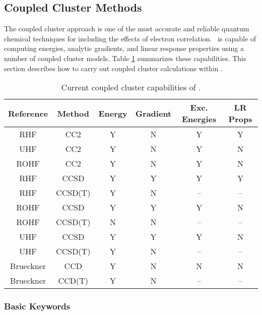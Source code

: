 \subsection{Coupled Cluster Methods} \label{cc}

The coupled cluster approach is one of the most accurate and reliable quantum
chemical techniques for including the effects of electron correlation.
\PSIthree\ is capable of computing energies, analytic gradients, and
linear response properties using a number of coupled cluster models.
Table \ref{table:ccsummary} summarizes these capabilities.  This section
describes how to carry out coupled cluster calculations within \PSIthree.
\begin{table}[h]
\begin{center}
\begin{tabular}{cccccc}
\hline
\hline
Reference & Method & Energy    & Gradient  &  Exc. Energies & LR Props \\
\hline
RHF       & CC2     & Y & N & Y & Y  \\
UHF       & CC2     & Y & N & Y & N  \\
ROHF      & CC2     & Y & N & Y & N  \\
RHF       & CCSD    & Y & Y & Y & Y  \\
RHF       & CCSD(T) & Y & N & --& -- \\
ROHF      & CCSD    & Y & Y & Y & N  \\
ROHF      & CCSD(T) & N & N & --& -- \\
UHF       & CCSD    & Y & Y & Y & N  \\
UHF       & CCSD(T) & Y & N & --& -- \\
Brueckner & CCD     & Y & N & N & N  \\
Brueckner & CCD(T)  & Y & N & --& -- \\
\hline
\hline
\end{tabular}
\end{center}
\caption{Current coupled cluster capabilities of \PSIthree.}
\label{table:ccsummary}
\end{table}

\subsubsection{Basic Keywords}


